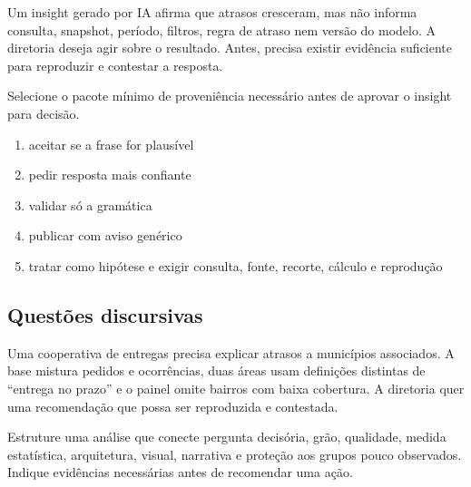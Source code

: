 
\TextoBase

Um insight gerado por IA afirma que atrasos cresceram, mas não informa consulta, snapshot, período, filtros, regra de atraso nem versão do modelo. A diretoria deseja agir sobre o resultado. Antes, precisa existir evidência suficiente para reproduzir e contestar a resposta.

\FonteDidatica

\Comando Selecione o pacote mínimo de proveniência necessário antes de aprovar o insight para decisão.

\begin{enumerate}[label=\Alph*)]

\item aceitar se a frase for plausível

\item pedir resposta mais confiante

\item validar só a gramática

\item publicar com aviso genérico

\item tratar como hipótese e exigir consulta, fonte, recorte, cálculo e reprodução

\end{enumerate}

\subsection{Questões discursivas}


\TextoBase

Uma cooperativa de entregas precisa explicar atrasos a municípios associados. A base mistura pedidos e ocorrências, duas áreas usam definições distintas de ``entrega no prazo'' e o painel omite bairros com baixa cobertura. A diretoria quer uma recomendação que possa ser reproduzida e contestada.

\FonteDidatica

\Comando Estruture uma análise que conecte pergunta decisória, grão, qualidade, medida estatística, arquitetura, visual, narrativa e proteção aos grupos pouco observados. Indique evidências necessárias antes de recomendar uma ação.

